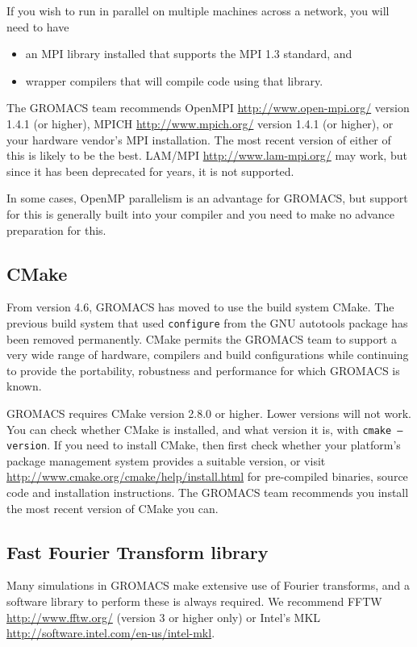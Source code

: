 \documentclass{article}[12pt,a4paper,twoside]
\newcommand{\gromacs}{GROMACS}
\newcommand{\fftw}{FFTW}
\newcommand{\mkl}{MKL}
\newcommand{\mpi}{MPI}
\newcommand{\openmpi}{OpenMPI}
\newcommand{\openmp}{OpenMP}
\newcommand{\lammpi}{LAM/MPI}
\newcommand{\mpich}{MPICH}
\newcommand{\cmake}{CMake}
\newcommand{\cmakeversion}{2.8.0}
\begin{document}
If you wish to run in parallel on multiple machines across a network,
you will need to have
\begin{itemize}
\item an \mpi{} library installed that supports the \mpi{} 1.3
  standard, and
\item wrapper compilers that will compile code using that library.
\end{itemize}
The \gromacs{} team recommends \openmpi{}
\url{http://www.open-mpi.org/} version 1.4.1 (or higher), \mpich{}
\url{http://www.mpich.org/} version 1.4.1 (or higher), or your
hardware vendor's \mpi{} installation. The most recent version of
either of this is likely to be the best. \lammpi{}
\url{http://www.lam-mpi.org/} may work, but since it has been
deprecated for years, it is not supported.

In some cases, \openmp{} parallelism is an advantage for \gromacs{},
but support for this is generally built into your compiler and you
need to make no advance preparation for this.

\subsection{CMake}

From version 4.6, \gromacs{} has moved to use the build system
\cmake{}. The previous build system that used \texttt{configure} from
the GNU autotools package has been removed permanently. \cmake{}
permits the \gromacs{} team to support a very wide range of hardware,
compilers and build configurations while continuing to provide the
portability, robustness and performance for which \gromacs{} is known.

\gromacs{} requires \cmake{} version \cmakeversion{} or higher. Lower
versions will not work. You can check whether \cmake{} is installed,
and what version it is, with \texttt{cmake --version}. If you need to
install \cmake{}, then first check whether your platform's package
management system provides a suitable version, or visit
\url{http://www.cmake.org/cmake/help/install.html} for pre-compiled
binaries, source code and installation instructions. The \gromacs{}
team recommends you install the most recent version of \cmake{} you
can.

\subsection{Fast Fourier Transform library}

Many simulations in \gromacs{} make extensive use of Fourier transforms,
and a software library to perform these is always required. We
recommend \fftw{} \url{http://www.fftw.org/} (version 3 or higher
only) or Intel's \mkl{}
\url{http://software.intel.com/en-us/intel-mkl}.
\end{document}
